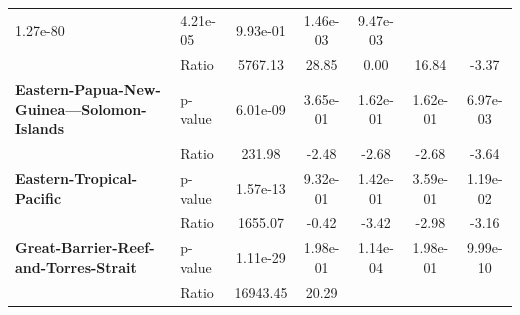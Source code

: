 \begin{table}[H]
{\begin{tabular}{llccccc}
            1.27e-80                                            & 4.21e-05 &
            9.93e-01                                            & 1.46e-03 &
            9.47e-03
            \\
            \textbf{}                                           & Ratio    &
            5767.13                                             & 28.85    &
            0.00
                                                                & 16.84    &
            -3.37
            \\
            \textbf{Eastern-Papua-New-Guinea---Solomon-Islands} &
            p-value                                             &
            6.01e-09                                            &
            3.65e-01                                            &
            1.62e-01                                            &
            1.62e-01                                            &
            6.97e-03
            \\
            \textbf{}                                           & Ratio    &
            231.98                                              & -2.48    &
            -2.68
                                                                & -2.68    &
            -3.64
            \\
            \textbf{Eastern-Tropical-Pacific}                   & p-value  &
            1.57e-13                                            & 9.32e-01 &
            1.42e-01                                            & 3.59e-01 &
            1.19e-02
            \\
            \textbf{}                                           & Ratio    &
            1655.07                                             & -0.42    &
            -3.42
                                                                & -2.98    &
            -3.16
            \\
            \textbf{Great-Barrier-Reef-and-Torres-Strait}       &
            p-value                                             &
            1.11e-29                                            &
            1.98e-01                                            &
            1.14e-04                                            &
            1.98e-01                                            &
            9.99e-10
            \\
            \textbf{}                                           & Ratio    &
            16943.45                                            & 20.29    &

\end{tabular}}
\end{table}

